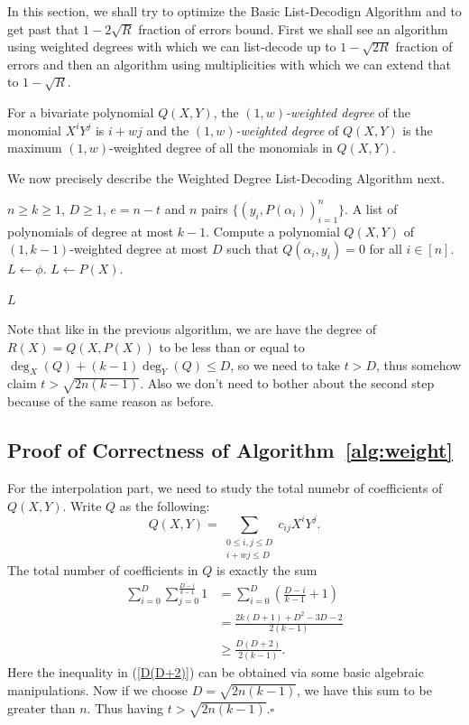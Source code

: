 In this section, we shall try to optimize the Basic List-Decodign Algorithm and to get past that $1 - 2\sqrt{R}$ fraction of errors bound. First we shall see an algorithm using weighted degrees with which we can list-decode up to $1 - \sqrt{2R}$ fraction of errors and then an algorithm using multiplicities with which we can extend that to $1 - \sqrt{R}$.

\begin{definition}[]
	\label{def:weight}
	For a bivariate polynomial $Q(X,Y)$, the $(1, w)$\emph{-weighted degree} of the monomial $X^iY^j$ is $i + wj$ and the $(1,w)$\emph{-weighted degree} of $Q(X,Y)$ is the maximum $(1,w)$-weighted degree of all the monomials in $Q(X,Y)$.
\end{definition}

We now precisely describe the Weighted Degree List-Decoding Algorithm next.

\begin{algorithm}\label{alg:weight}
	\large
  \caption{\large Weighted Degree List-Decoding Algorithm for Reed-Solomon Codes}
  \begin{algorithmic}[1]
  	\large
	\Input $n\geq k\geq 1$, $D\geq1$, $e = n - t$ and $n$ pairs $\{(y_i, P(\alpha_i))_{i=1}^n\}$.
	\Output A list of polynomials of degree at most $k-1$.
	\State Compute a polynomial $Q(X,Y)$ of $(1,k-1)$-weighted degree at most $D$ such that $Q(\alpha_i,y_i) = 0$ for all $i\in[n]$.
	\State $L\leftarrow\phi$.
	\State $L\leftarrow P(X)$.
	\EndIf
	\EndFor
	
	\State \Return $L$
  \end{algorithmic}
\end{algorithm}

Note that like in the previous algorithm, we are have the degree of $R(X) = Q(X,P(X))$ to be less than or equal to $\deg_X(Q) + (k-1)\deg_Y(Q) \leq D$, so we need to take $t>D$, thus somehow claim $t>\sqrt{2n(k-1)}$. Also we don't need to bother about the second step because of the same reason as before.

\subsection*{Proof of Correctness of Algorithm~\ref{alg:weight}}
For the interpolation part, we need to study the total numebr of coefficients of $Q(X,Y)$. Write $Q$ as the following:
\[
	Q(X,Y) = \sum_{\substack{0\leq i, j \leq D \\ i + wj \leq D}}c_{ij}X^iY^j.
\]
 The total number of coefficients in $Q$ is exactly the sum 
 \begin{align}
 \sum_{i = 0}^D\sum_{j = 0}^{\frac{D - i}{k-1}}1 
 & = \sum_{i = 0}^D\left(\frac{D-i}{k-1} + 1\right) \\
 & = \frac{2k(D+1) + D^2 -3D - 2}{2(k-1)}\\
 & \geq \frac{D(D+2)}{2(k-1)}.\label{D(D+2)} 
 \end{align}
 Here the inequality in (\ref{D(D+2)}) can be obtained via some basic algebraic manipulations. Now if we choose $D = \sqrt{2n(k-1)}$, we have this sum to be greater than $n$. Thus having $t>\sqrt{2n(k-1)}$.\hfill$\square$
 
